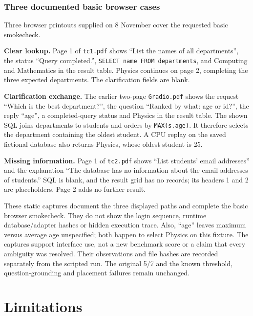 \documentclass[11pt,a4paper]{article}
\newcommand{\file}[1]{\nolinkurl{#1}}
\begin{document}
\subsubsection{Three documented basic browser cases}
Three browser printouts supplied on 8 November cover the requested basic smokecheck.

\textbf{Clear lookup.} Page 1 of \file{tc1.pdf} shows ``List the names of all departments'', the status
``Query completed.'', \texttt{SELECT name FROM departments}, and Computing and Mathematics in the result
table. Physics continues on page 2, completing the three expected departments. The clarification fields
are blank.

\textbf{Clarification exchange.} The earlier two-page \file{Gradio.pdf} shows the request ``Which is the best department?'',
the question ``Ranked by what: age or id?'', the reply ``age'', a completed-query status and Physics in
the result table. The shown SQL joins departments to students and orders by \file{MAX(s.age)}.
It therefore selects the department containing the oldest student. A CPU replay on the saved fictional
database also returns Physics, whose oldest student is 25.

\textbf{Missing information.} Page 1 of \file{tc2.pdf} shows ``List students' email addresses'' and the
explanation ``The database has no information about the email addresses of students.'' SQL is blank,
and the result grid has no records; its headers 1 and 2 are placeholders. Page 2 adds no further result.

These static captures document the three displayed paths and complete the basic browser smokecheck.
They do not show the login sequence, runtime database/adapter hashes or hidden execution trace. Also,
``age'' leaves maximum versus average age unspecified; both happen to select Physics on this fixture.
The captures support interface use, not a new benchmark score or a claim that every ambiguity was resolved.
Their observations and file hashes are recorded separately from the scripted run. The original 5/7 and
the known threshold, question-grounding and placement failures remain unchanged.

\section{Limitations}
\end{document}
